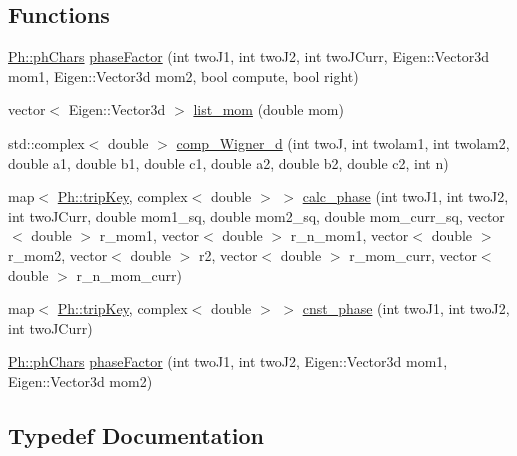 \subsection*{Functions}
\begin{DoxyCompactItemize}
\item 
\mbox{\hyperlink{structPh_1_1phChars}{Ph\+::ph\+Chars}} \mbox{\hyperlink{namespacePh_abd30593224e56992e6e15dc98728ad0b}{phase\+Factor}} (int two\+J1, int two\+J2, int two\+J\+Curr, Eigen\+::\+Vector3d mom1, Eigen\+::\+Vector3d mom2, bool compute, bool right)
\item 
vector$<$ Eigen\+::\+Vector3d $>$ \mbox{\hyperlink{namespacePh_a54c2023181613e6aacf1ec346c11bf9a}{list\+\_\+mom}} (double mom)
\item 
std\+::complex$<$ double $>$ \mbox{\hyperlink{namespacePh_a47fd4e2846a9ce86464940bc5f4cccf8}{comp\+\_\+\+Wigner\+\_\+d}} (int twoJ, int twolam1, int twolam2, double a1, double b1, double c1, double a2, double b2, double c2, int n)
\item 
map$<$ \mbox{\hyperlink{namespacePh_afdd5bf3d7b37625115089ea3048e0cbb}{Ph\+::trip\+Key}}, complex$<$ double $>$ $>$ \mbox{\hyperlink{namespacePh_a8662b8eefea46c114386b136878a461c}{calc\+\_\+phase}} (int two\+J1, int two\+J2, int two\+J\+Curr, double mom1\+\_\+sq, double mom2\+\_\+sq, double mom\+\_\+curr\+\_\+sq, vector$<$ double $>$ r\+\_\+mom1, vector$<$ double $>$ r\+\_\+n\+\_\+mom1, vector$<$ double $>$ r\+\_\+mom2, vector$<$ double $>$ r2, vector$<$ double $>$ r\+\_\+mom\+\_\+curr, vector$<$ double $>$ r\+\_\+n\+\_\+mom\+\_\+curr)
\item 
map$<$ \mbox{\hyperlink{namespacePh_afdd5bf3d7b37625115089ea3048e0cbb}{Ph\+::trip\+Key}}, complex$<$ double $>$ $>$ \mbox{\hyperlink{namespacePh_ac0bb2f4b2888c7c304cb6fcb1b5a7ce2}{cnst\+\_\+phase}} (int two\+J1, int two\+J2, int two\+J\+Curr)
\item 
\mbox{\hyperlink{structPh_1_1phChars}{Ph\+::ph\+Chars}} \mbox{\hyperlink{namespacePh_a51140cf285f02c028134a1e40807b54b}{phase\+Factor}} (int two\+J1, int two\+J2, Eigen\+::\+Vector3d mom1, Eigen\+::\+Vector3d mom2)
\end{DoxyCompactItemize}


\subsection{Typedef Documentation}
\mbox{\label{namespacePh_afdd5bf3d7b37625115089ea3048e0cbb}} 
